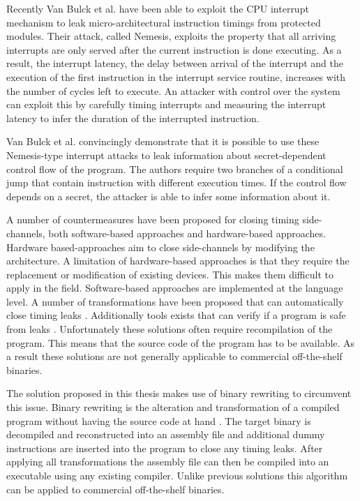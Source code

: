 Recently Van Bulck et al. \cite{Nemesis} have been able to exploit the CPU interrupt mechanism to leak micro-architectural instruction timings from protected modules. 
Their attack, called Nemesis, exploits the property that all arriving interrupts are only served after the current instruction is done executing. 
As a result, the interrupt latency, the delay between arrival of the interrupt and the execution of the first instruction in the interrupt service routine, increases with the number of cycles left to execute.
An attacker with control over the system can exploit this by carefully timing interrupts and measuring the interrupt latency to infer the duration of the interrupted instruction. 

Van Bulck et al. \cite{Nemesis} convincingly demonstrate that it is possible to use these Nemesis-type interrupt attacks to leak information about secret-dependent control flow of the program. 
The authors require two branches of a conditional jump that contain instruction with different execution times. 
If the control flow depends on a secret, the attacker is able to infer some information about it. 

A number of countermeasures have been proposed for closing timing side-channels, both software-based approaches and hardware-based approaches. 
Hardware based-approaches aim to close side-channels by modifying the architecture. 
A limitation of hardware-based approaches is that they require the replacement or modification of existing devices. This makes them difficult
to apply in the field. 
Software-based approaches are implemented at the language level. A number of transformations have been proposed that can automatically close timing leaks \cite{programcounter}. 
Additionally tools exists that can verify if a program is safe from leaks \cite{verify-constant-time, Barthe}. Unfortunately these solutions often require recompilation of the program. This means
that the source code of the program has to be available. As a result these solutions are not generally applicable to commercial off-the-shelf binaries. 

The solution proposed in this thesis makes use of binary rewriting to circumvent this issue. Binary rewriting is the alteration and transformation of a compiled program without having the source code at hand \cite{rewriting-survey}. 
The target binary is decompiled and reconstructed into an assembly file and additional dummy instructions are inserted into the program to close any timing leaks. 
After applying all transformations the assembly file can then be compiled into an executable using any existing compiler. 
Unlike previous solutions this algorithm can be applied to commercial off-the-shelf binaries. 

